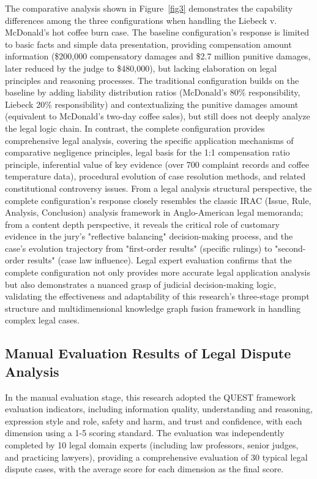 \documentclass{article}
\theoremstyle{plain}
\theoremstyle{definition}
\begin{document}
The comparative analysis shown in Figure~\ref{fig3} demonstrates the capability differences among the three configurations when handling the Liebeck v. McDonald's hot coffee burn case. The baseline configuration's response is limited to basic facts and simple data presentation, providing compensation amount information (\$200,000 compensatory damages and \$2.7 million punitive damages, later reduced by the judge to \$480,000), but lacking elaboration on legal principles and reasoning processes. The traditional configuration builds on the baseline by adding liability distribution ratios (McDonald's 80\% responsibility, Liebeck 20\% responsibility) and contextualizing the punitive damages amount (equivalent to McDonald's two-day coffee sales), but still does not deeply analyze the legal logic chain. In contrast, the complete configuration provides comprehensive legal analysis, covering the specific application mechanisms of comparative negligence principles, legal basis for the 1:1 compensation ratio principle, inferential value of key evidence (over 700 complaint records and coffee temperature data), procedural evolution of case resolution methods, and related constitutional controversy issues. From a legal analysis structural perspective, the complete configuration's response closely resembles the classic IRAC (Issue, Rule, Analysis, Conclusion) analysis framework in Anglo-American legal memoranda; from a content depth perspective, it reveals the critical role of customary evidence in the jury's "reflective balancing" decision-making process, and the case's evolution trajectory from "first-order results" (specific rulings) to "second-order results" (case law influence). Legal expert evaluation confirms that the complete configuration not only provides more accurate legal application analysis but also demonstrates a nuanced grasp of judicial decision-making logic, validating the effectiveness and adaptability of this research's three-stage prompt structure and multidimensional knowledge graph fusion framework in handling complex legal cases.

\FloatBarrier
\subsection{Manual Evaluation Results of Legal Dispute Analysis}
\label{sec4.3}

In the manual evaluation stage, this research adopted the QUEST framework evaluation indicators, including information quality, understanding and reasoning, expression style and role, safety and harm, and trust and confidence, with each dimension using a 1-5 scoring standard. The evaluation was independently completed by 10 legal domain experts (including law professors, senior judges, and practicing lawyers), providing a comprehensive evaluation of 30 typical legal dispute cases, with the average score for each dimension as the final score.
\end{document}
